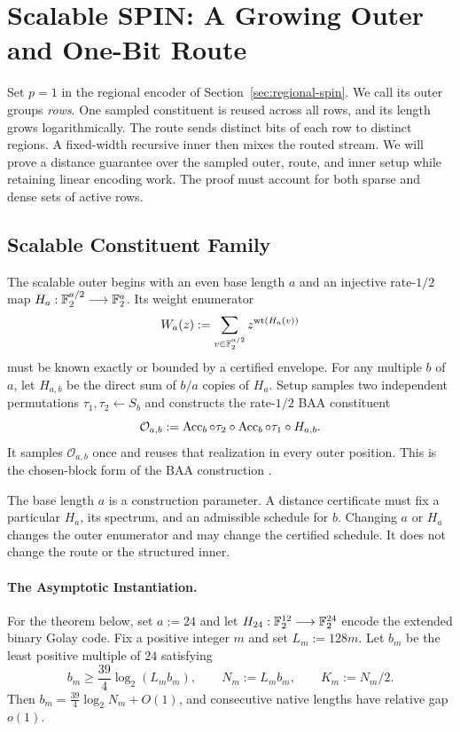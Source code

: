\section{Scalable SPIN: A Growing Outer and One-Bit Route}
\label{sec:structured-distance}

Set $p=1$ in the regional encoder of Section~\ref{sec:regional-spin}.
We call its outer groups \emph{rows}. One sampled constituent is reused
across all rows, and its length grows logarithmically. The route sends
distinct bits of each row to distinct regions. A fixed-width recursive
inner then mixes the routed stream. We will prove a distance guarantee
over the sampled outer, route, and inner setup while retaining linear
encoding work. The proof must account for both sparse and dense sets of
active rows.

\subsection{Scalable Constituent Family}
\label{sec:structured-scalable}

The scalable outer begins with an even base length $a$ and an injective
rate-$1/2$ map $H_a:\mathbb F_2^{a/2}\longrightarrow\mathbb F_2^a$.
Its weight enumerator
\[
  W_a(z):=\sum_{v\in\mathbb F_2^{a/2}}z^{\operatorname{wt}(H_a(v))}
\]
must be known exactly or bounded by a certified envelope. For any multiple
$b$ of $a$, let $H_{a,b}$ be the direct sum of $b/a$ copies of $H_a$.
Setup samples two independent permutations $\tau_1,\tau_2\gets S_b$ and
constructs the rate-$1/2$ BAA constituent
\begin{equation}
  \mathcal O_{a,b}
  :=
  \operatorname{Acc}_b\circ\tau_2\circ
  \operatorname{Acc}_b\circ\tau_1\circ H_{a,b}.
  \label{eq:ba3-outer}
\end{equation}
It samples $\mathcal O_{a,b}$ once and reuses that realization in every outer
position. This is the chosen-block form of the BAA construction
\cite{KolesnikovEtAl2026BA,cryptoeprint:2026/1903}.

The base length $a$ is a construction parameter. A distance certificate must
fix a particular $H_a$, its spectrum, and an admissible schedule for $b$.
Changing $a$ or $H_a$ changes the outer enumerator and may change the certified
schedule. It does not change the route or the structured inner.

\paragraph{The Asymptotic Instantiation.}
For the theorem below, set $a:=24$ and let
$H_{24}:\mathbb F_2^{12}\longrightarrow\mathbb F_2^{24}$ encode the extended binary Golay code. Fix a positive integer $m$ and set
$L_m:=128m$. Let $b_m$ be the least positive multiple of $24$ satisfying
\begin{equation}
  b_m\ge \frac{39}{4}\log_2(L_mb_m),
  \qquad
  N_m:=L_mb_m,
  \qquad
  K_m:=N_m/2.
  \label{eq:structured-native-schedule}
\end{equation}
Then $b_m=\frac{39}{4}\log_2N_m+O(1)$, and consecutive native lengths have relative
gap $o(1)$.

